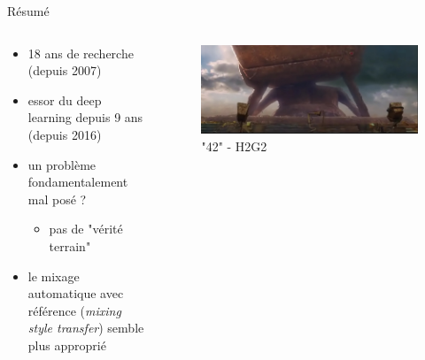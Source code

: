 \documentclass[9pt, aspectratio=169]{beamer}
\begin{document}
\begin{frame}{Résumé} %
\begin{columns}
    \begin{column}{0.58\textwidth}
    
\begin{itemize}
	\item 18 ans de recherche (depuis 2007)
	\item essor du deep learning depuis 9 ans (depuis 2016)
	\item un problème fondamentalement mal posé ?
	\begin{itemize}
		\item pas de "vérité terrain"~\cite{birtchnell_automating_2018}
	\end{itemize}
	\item le mixage automatique avec référence (\emph{mixing style transfer}) semble plus approprié~\cite{vanka_diff-mst_2024}
\end{itemize}

\end{column}
    \begin{column}{0.42\textwidth}
    \begin{figure}
    \includegraphics[width=\textwidth]{fig/deep_thought.jpg}
    \caption{"42" - H2G2}    
    \end{figure}

    \end{column}
\end{columns}
\end{frame}
\end{document}
